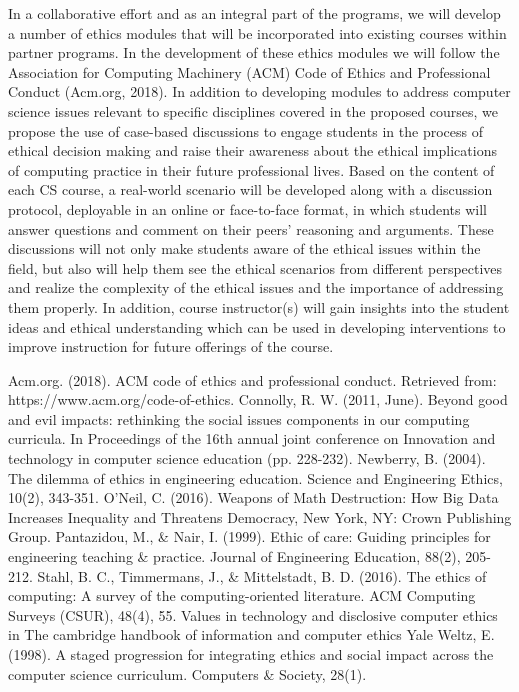 In a collaborative effort and as an integral part of the programs, we will develop a number of ethics modules that will be incorporated into existing courses within partner programs. In the development of these ethics modules we will follow the Association for Computing Machinery (ACM) Code of Ethics and Professional Conduct (Acm.org, 2018). In addition to developing modules to address computer science issues relevant to specific disciplines covered in the proposed courses, we propose the use of case-based discussions to engage students in the process of ethical decision making and raise their awareness about the ethical implications of computing practice in their future professional lives. Based on the content of each CS course, a real-world scenario will be developed along with a discussion protocol, deployable in an online or face-to-face format, in which students will answer questions and comment on their peers’ reasoning and arguments. These discussions will not only make students aware of the ethical issues within the field, but also will help them see the ethical scenarios from different perspectives and  realize the complexity of the ethical issues and the importance of addressing them properly. In addition, course instructor(s) will gain insights into the student ideas and ethical understanding which can be used in developing interventions to improve instruction for future offerings of the course.

Acm.org. (2018). ACM code of ethics and professional conduct. Retrieved from: https://www.acm.org/code-of-ethics.
Connolly, R. W. (2011, June). Beyond good and evil impacts: rethinking the social issues components in our computing curricula. In Proceedings of the 16th annual joint conference on Innovation and technology in computer science education (pp. 228-232).
Newberry, B. (2004). The dilemma of ethics in engineering education. Science and Engineering Ethics, 10(2), 343-351.
O’Neil, C. (2016). Weapons of Math Destruction: How Big Data Increases Inequality and Threatens Democracy, New York, NY: Crown Publishing Group.
Pantazidou, M., \& Nair, I. (1999). Ethic of care: Guiding principles for engineering teaching \& practice. Journal of Engineering Education, 88(2), 205-212.
Stahl, B. C., Timmermans, J., \& Mittelstadt, B. D. (2016). The ethics of computing: A survey of the computing-oriented literature. ACM Computing Surveys (CSUR), 48(4), 55.
Values in technology and disclosive computer ethics in The cambridge handbook of information and computer ethics 
Yale Weltz, E. (1998). A staged progression for integrating ethics and social impact across the computer science curriculum. Computers \& Society, 28(1).


